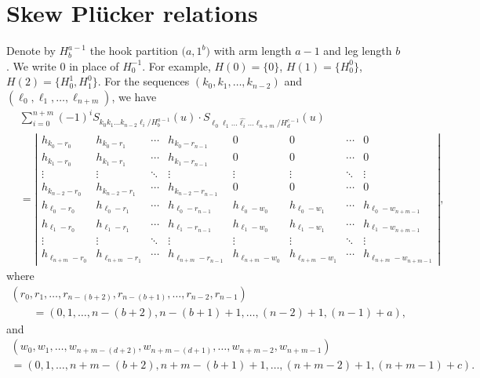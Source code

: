 \documentclass[10pt,a4paper]{amsart}
\numberwithin{equation}{section}
\begin{document}
\section{Skew Pl\"ucker relations}\label{section3}
Denote by $H^{a-1}_{b}$ the hook partition $\bigl(a,1^b\bigr)$ with arm length $a-1$ and leg length $b$.
We write $0$ in place of $H^{-1}_{0}$. For example, $H(0)=\{0\}$, $H(1)=\bigl\{H^{0}_{0}\bigr\}$, $H(2)=\bigl\{H^{1}_{0},H^{0}_{1}\bigr\}$. For the sequences $(k_{0},k_1,\dots,k_{n-2})$ and $(\ell_0,\ell_1,\dots, \ell_{n+m})$, we have
\begin{align}
&\sum_{i=0}^{n+m}{(-1)}^{i}S_{k_0 k_1\dots k_{n-2}\ell_i/{H^{a-1}_{b}}}(u)\cdot S_{\ell_0 \ell_1\dots \widehat{\ell_{i}}\dots\ell_{n+m}/{H^{c-1}_{d}}}(u)\label{skewplu}\\
&=\left|\begin{array}{cccc|cccc}
h_{k_0-r_{0}^{}} & h_{k_0-r_{1}^{}} & \cdots &h_{k_0-r_{n-1}^{}}& 0 & 0 & \cdots & 0\\
h_{k_{1}-r_{0}^{}} & h_{k_{1}-r_{1}^{}} & \cdots &h_{k_{1}-r_{n-1}^{}}& 0 & 0 & \cdots & 0 \\
\vdots & \vdots & \ddots & \vdots & \vdots &\vdots & \ddots & \vdots \\
h_{k_{n-2}-r_{0}^{}} & h_{k_{n-2}-r_{1}^{}} & \cdots &h_{k_{n-2}-r_{n-1}^{}} &0 & 0 & \cdots & 0 \\
h_{\ell_0-r_{0}^{}} & h_{\ell_0-r_{1}^{}} & \cdots &h_{{\ell_0}-r_{n-1}^{}}& h_{\ell_{0}-w_{0}^{}} & h_{\ell_{0}-w_{1}^{}} & \cdots & h_{\ell_{0}-w_{n+m-1}^{}} \\[1mm]\hline
h_{\ell_1-r_{0}^{}} & h_{\ell_1-r_{1}^{}} & \cdots &h_{{\ell_1}-r_{n-1}^{}}& h_{\ell_{1}-w_{0}^{}}& h_{\ell_{1}-w_{1}^{}} & \cdots & h_{\ell_{1}-w_{n+m-1}^{}}\\
\vdots & \vdots& \ddots & \vdots &\vdots &\vdots & \ddots & \vdots \\
h_{\ell_{n+m}-r_{0}^{}} & h_{\ell_{n+m}-r_{1}^{}} & \cdots &h_{{\ell_{n+m}}-r_{n-1}^{}}& h_{\ell_{n+m}-w_{0}^{}} & h_{\ell_{n+m}-w_{1}^{}} & \cdots & h_{\ell_{n+m}-w_{n+m-1}^{}}
\end{array}\right|\!,\nonumber%
\end{align}
where
\begin{gather*}
(r_0,r_1,\dots,r_{n-(b+2)},r_{n-(b+1)},\dots,r_{n-2},r_{n-1})\\
\qquad{}=(0,1,\dots,n-(b+2),n-(b+1)+1,\dots,(n-2)+1,(n-1)+a),
\end{gather*}
and
\begin{gather*}
(w_0,w_1,\dots,w_{n+m-(d+2)},w_{n+m-(d+1)},\dots,w_{n+m-2},w_{n+m-1})\\
=(0,1,\dots,n+m-(b+2),n+m-(b+1)+1,\dots,(n+m-2)+1,(n+m-1)+c).
\end{gather*}
\end{document}
